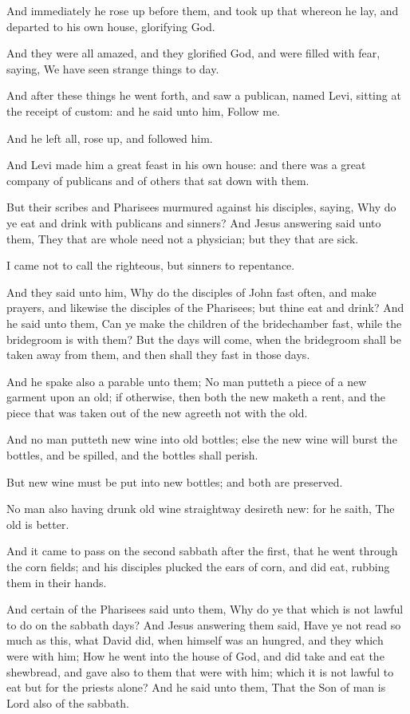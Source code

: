 \Verse And immediately he rose up before them, and took up that whereon he lay, and departed to his own house, glorifying God.

\Verse And they were all amazed, and they glorified God, and were filled with fear, saying, We have seen strange things to day.

\Verse And after these things he went forth, and saw a publican, named Levi, sitting at the receipt of custom: and he said unto him, Follow me.

\Verse And he left all, rose up, and followed him.

\Verse And Levi made him a great feast in his own house: and there was a great company of publicans and of others that sat down with them.

\Verse But their scribes and Pharisees murmured against his disciples, saying, Why do ye eat and drink with publicans and sinners?  \Verse And Jesus answering said unto them, They that are whole need not a physician; but they that are sick.

\Verse I came not to call the righteous, but sinners to repentance.

\Verse And they said unto him, Why do the disciples of John fast often, and make prayers, and likewise the disciples of the Pharisees; but thine eat and drink?  \Verse And he said unto them, Can ye make the children of the bridechamber fast, while the bridegroom is with them?  \Verse But the days will come, when the bridegroom shall be taken away from them, and then shall they fast in those days.

\Verse And he spake also a parable unto them; No man putteth a piece of a new garment upon an old; if otherwise, then both the new maketh a rent, and the piece that was taken out of the new agreeth not with the old.

\Verse And no man putteth new wine into old bottles; else the new wine will burst the bottles, and be spilled, and the bottles shall perish.

\Verse But new wine must be put into new bottles; and both are preserved.

\Verse No man also having drunk old wine straightway desireth new: for he saith, The old is better.


\Chapter
\Verse And it came to pass on the second sabbath after the first, that he went through the corn fields; and his disciples plucked the ears of corn, and did eat, rubbing them in their hands.

\Verse And certain of the Pharisees said unto them, Why do ye that which is not lawful to do on the sabbath days?  \Verse And Jesus answering them said, Have ye not read so much as this, what David did, when himself was an hungred, and they which were with him; \Verse How he went into the house of God, and did take and eat the shewbread, and gave also to them that were with him; which it is not lawful to eat but for the priests alone?  \Verse And he said unto them, That the Son of man is Lord also of the sabbath.

